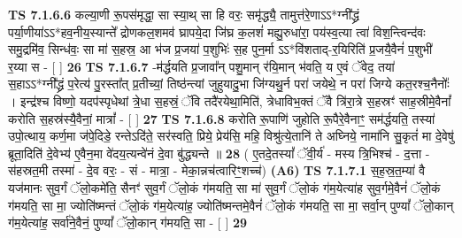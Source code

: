\documentclass[17pt]{extarticle}
\begin{document}
                  \newline
                                \textbf{ TS 7.1.6.6} \newline
                  कल्या॒णी रू॒पस॑मृद्धा॒ सा स्या॒थ् सा हि वरः॒ समृ॑द्ध्यै॒ तामुत्त॑रे॒णाऽऽ*ग्नी᳚द्ध्रं पर्या॒णीया॑ऽऽ*हव॒नीय॒स्यान्ते᳚ द्रोणकल॒शमव॑ घ्रापये॒दा जि॑घ्र क॒लशं॑ मह्यु॒रुधा॑रा॒ पय॑स्व॒त्या त्वा॑ विश॒न्त्विन्द॑वः समु॒द्रमि॑व॒ सिन्ध॑वः॒ सा मा॑ स॒हस्र॒ आ भ॑ज प्र॒जया॑ प॒शुभिः॑ स॒ह पुन॒र्मा ऽऽ*वि॑शताद्-र॒यिरिति॑ प्र॒जयै॒वैनं॑ प॒शुभी॑ र॒य्या स - [  ] \textbf{  26} \newline
                  \newline
                                \textbf{ TS 7.1.6.7} \newline
                  -म॑र्द्धयति प्र॒जावा᳚न् पशु॒मान् र॑यि॒मान् भ॑वति॒ य ए॒वं ॅवेद॒ तया॑ स॒हाऽऽ*ग्नी᳚द्ध्रं प॒रेत्य॑ पु॒रस्ता᳚त् प्र॒तीच्यां॒ तिष्ठ॑न्त्यां जुहुयादु॒भा जि॑ग्यथु॒र्न परा॑ जयेथे॒ न परा॑ जिग्ये कत॒रश्च॒नैनोः᳚ । इन्द्र॑श्च विष्णो॒ यदप॑स्पृधेथां त्रे॒धा स॒हस्रं॒ ॅवि तदै॑रयेथा॒मिति॑, त्रेधाविभ॒क्तं ॅवै त्रि॑रा॒त्रे स॒हस्रꣳ॑ साह॒स्रीमे॒वैनां᳚ करोति स॒हस्र॑स्यै॒वैनां॒ मात्रां᳚ - [  ] \textbf{  27} \newline
                  \newline
                                \textbf{ TS 7.1.6.8} \newline
                  करोति रू॒पाणि॑ जुहोति रू॒पैरे॒वैनाꣳ॒॒ सम॑र्द्धयति॒ तस्या॑ उपो॒त्थाय॒ कर्ण॒मा ज॑पे॒दिडे॒ रन्तेऽदि॑ते॒ सर॑स्वति॒ प्रिये॒ प्रेय॑सि॒ महि॒ विश्रु॑त्ये॒तानि॑ ते अघ्निये॒ नामा॑नि सु॒कृतं॑ मा दे॒वेषु॑ ब्रूता॒दिति॑ दे॒वेभ्य॑ ए॒वैन॒मा वे॑दय॒त्यन्वे॑नं दे॒वा बु॑द्ध्यन्ते ॥ \textbf{  28 } \newline
                  \newline
                      ( ए॒तदे॒तस्यां᳚ ॅवी॒र्य॑ - मस्य त्रि॒भिश्च॑ - द॒त्ता - स॑हस्रत॒मी तस्मा॑ - दे॒व वरः॒ - सं - मात्रा॒ - मेका॒न्नच॑त्वारिꣳ॒॒शच्च॑)  \textbf{(A6)} \newline \newline
                                        \textbf{ TS 7.1.7.1} \newline
                  स॒ह॒स्र॒त॒म्या॑ वै यज॑मानः सुव॒र्गं ॅलो॒कमे॑ति॒ सैनꣳ॑ सुव॒र्गं ॅलो॒कं ग॑मयति॒ सा मा॑ सुव॒र्गं ॅलो॒कं ग॑म॒येत्या॑ह सुव॒र्गमे॒वैनं॑ ॅलो॒कं ग॑मयति॒ सा मा॒ ज्योति॑ष्मन्तं ॅलो॒कं ग॑म॒येत्या॑ह॒ ज्योति॑ष्मन्तमे॒वैनं॑ ॅलो॒कं ग॑मयति॒ सा मा॒ सर्वा॒न् पुण्यां᳚ ॅलो॒कान् ग॑म॒येत्या॑ह॒ सर्वा॑ने॒वैनं॒ पुण्यां᳚ ॅलो॒कान् ग॑मयति॒ सा - [  ] \textbf{  29} \newline
                  \newline
\end{document}
